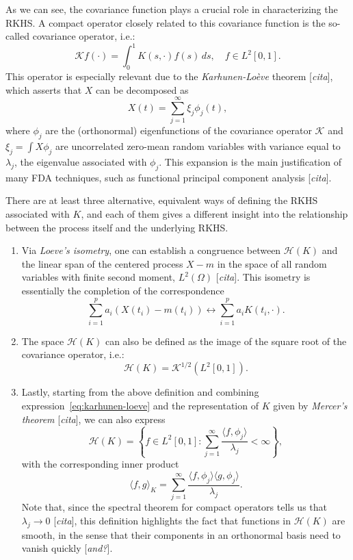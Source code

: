 \documentclass[ba]{imsart}
\numberwithin{equation}{section}
\theoremstyle{plain}
\newcommand\incomment[1]{\color{red}[\textit{#1}]\color{black}}
\begin{document}
As we can see, the covariance function plays a crucial role in characterizing the RKHS. A compact operator closely related to this covariance function is the so-called covariance operator, i.e.:
\[
\mathcal Kf(\cdot) = \int_0^1 K(s, \cdot)f(s)\, ds, \quad f \in L^2[0, 1].
\]
This operator is especially relevant due to the \textit{Karhunen-Loève} theorem \incomment{cita}, which asserts that \(X\) can be decomposed as
\begin{equation}\label{eq:karhunen-loeve}
X(t) = \sum_{j=1}^\infty \xi_j \phi_j(t),
\end{equation}
where \(\phi_j\) are the (orthonormal) eigenfunctions of the covariance operator \(\mathcal K\) and \(\xi_j = \int X\phi_j\) are uncorrelated zero-mean random variables with variance equal to \(\lambda_j\), the eigenvalue associated with \(\phi_j\). This expansion is the main justification of many FDA techniques, such as functional principal component analysis \incomment{cita}.

There are at least three alternative, equivalent ways of defining the RKHS associated with \(K\), and each of them gives a different insight into the relationship between the process itself and the underlying RKHS.

\begin{enumerate}
  \item Via \textit{Loeve's isometry}, one can establish a congruence between \(\mathcal H(K)\) and the linear span of the centered process \(X - m\) in the space of all random variables with finite second moment, \(L^2(\Omega)\) \incomment{cita}. This isometry is essentially the completion of the correspondence
  \begin{equation}\label{eq:loeve}
  \sum_{i=1}^p a_i (X(t_i) - m(t_i)) \longleftrightarrow \sum_{i=1}^p a_i K(t_i, \cdot).
\end{equation}
  \item The space \(\mathcal H(K)\) can also be defined as the image of the square root of the covariance operator, i.e.:
  \begin{equation}\label{eq:rkhs-square-root}
  \mathcal H(K) = \mathcal K^{1/2}(L^2[0, 1]).
\end{equation}

  \item Lastly, starting from the above definition and combining expression~\eqref{eq:karhunen-loeve} and the representation of \(K\) given by \textit{Mercer's theorem} \incomment{cita}, we can also express
  \begin{equation}\label{rkhs-sum-lambda}
    \mathcal H(K) = \left\{f \in L^2[0, 1]: \sum_{j=1}^\infty \frac{\langle f, \phi_j\rangle}{\lambda_j} < \infty \right\},
  \end{equation}
  with the corresponding inner product
  \[
  \langle f, g\rangle_K = \sum_{j=1}^\infty \frac{\langle f, \phi_j\rangle\langle g, \phi_j\rangle}{\lambda_j}.
  \]
Note that, since the spectral theorem for compact operators tells us that \(\lambda_j \to 0\) \incomment{cita}, this definition highlights the fact that functions in \(\mathcal H(K)\) are smooth, in the sense that their components in an orthonormal basis need to vanish quickly \incomment{and?}.
\end{enumerate}
\end{document}
